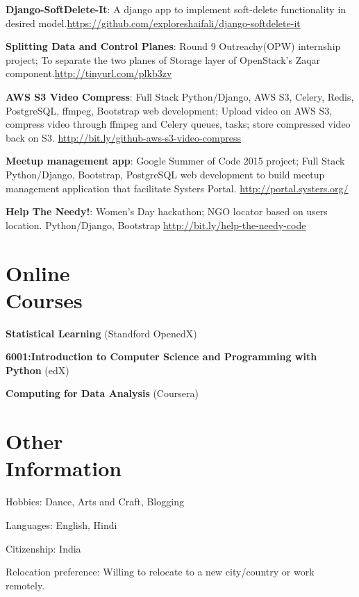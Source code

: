 \documentclass[margin,line]{resume}
\begin{document}
\begin{resume}
\begin{list2}
    \item \textbf{Django-SoftDelete-It}: A django app to implement soft-delete functionality in desired model.\url{https://github.com/exploreshaifali/django-softdelete-it}
    \item \textbf{Splitting Data and Control Planes}: Round 9 Outreachy(OPW) internship project; To separate the two planes of Storage layer of OpenStack's Zaqar component.\url{http://tinyurl.com/plkb3zv}
    \item \textbf{AWS S3 Video Compress}: Full Stack Python/Django, AWS S3, Celery, Redis, PostgreSQL, ffmpeg, Bootstrap web development; Upload video on AWS S3, compress video through ffmpeg and Celery queues, tasks; store compressed video back on S3. \url{http://bit.ly/github-aws-s3-video-compress}
    \item \textbf{Meetup management app}: Google Summer of Code 2015 project; Full Stack Python/Django, Bootstrap, PostgreSQL web development to build meetup management application that facilitate Systers Portal. \url{http://portal.systers.org/}	
    \item \textbf{Help The Needy!}: Women's Day hackathon; NGO locator based on users location. Python/Django, Bootstrap \url{http://bit.ly/help-the-needy-code}
    \end{list2}

    \section{\mysidestyle Online \\ Courses}

    \begin{list2}
	\item \textbf{Statistical Learning} (Standford OpenedX)
	\item \textbf{6001:Introduction to Computer Science and Programming with Python} (edX)
	\item \textbf{Computing for Data Analysis} (Coursera)
	\end{list2}

    \section{\mysidestyle Other \\ Information}
    \begin{list2}
    \item Hobbies: Dance, Arts and Craft, Blogging
    \item Languages: English, Hindi
    \item Citizenship: India
    \item Relocation preference: Willing to relocate to a new city/country or work remotely.   
    \end{list2}

\end{resume}
\end{document}
